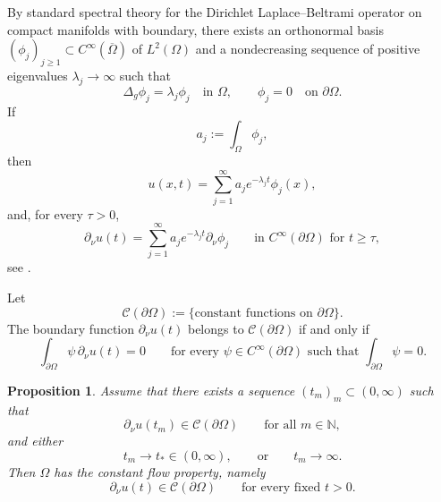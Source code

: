 \documentclass[a4paper,11pt]{article}
\newtheorem{proposition}[theorem]{Proposition}
\numberwithin{equation}{section}
\begin{document}
By standard spectral theory for the Dirichlet Laplace--Beltrami operator on
compact manifolds with boundary, there exists an orthonormal basis
$(\phi_j)_{j\geq 1}\subset C^\infty(\overline{\Omega})$ of $L^2(\Omega)$ and
a nondecreasing sequence of positive eigenvalues $\lambda_j\to\infty$ such
that
\[
\Delta_g\phi_j=\lambda_j\phi_j\quad\text{in }\Omega,\qquad \phi_j=0
\quad\text{on }\partial\Omega.
\]
If
\[
a_j:=\int_\Omega \phi_j,
\]
then
\begin{equation}\label{eq:spectral-u}
u(x,t)=\sum_{j=1}^\infty a_j e^{-\lambda_j t}\phi_j(x),
\end{equation}
and, for every $\tau>0$,
\begin{equation}\label{eq:spectral-du}
\partial_\nu u(t)=\sum_{j=1}^\infty a_j e^{-\lambda_j t}\partial_\nu\phi_j
\qquad\text{in }C^\infty(\partial\Omega)\text{ for }t\geq \tau,
\end{equation}
see \cite[Chapters VI--VII]{MR768584}.

Let
\[
\mathcal C(\partial\Omega):=\{ \text{constant functions on }\partial\Omega\}.
\]
The boundary function $\partial_\nu u(t)$ belongs to
$\mathcal C(\partial\Omega)$ if and only if
\[
\int_{\partial\Omega}\psi\,\partial_\nu u(t)=0
\qquad\text{for every }\psi\in C^\infty(\partial\Omega)
\text{ such that }\int_{\partial\Omega}\psi=0.
\]

\begin{proposition}\label{prop:riem-cfp}
Assume that there exists a sequence $(t_m)_m\subset (0,\infty)$ such that
\[
\partial_\nu u(t_m)\in \mathcal C(\partial\Omega)\qquad\text{for all }m\in\mathbb{N},
\]
and either
\[
t_m\to t_\ast\in (0,\infty),
\qquad\text{or}\qquad
t_m\to \infty.
\]
Then $\Omega$ has the \emph{constant flow property}, namely
\[
\partial_\nu u(t)\in \mathcal C(\partial\Omega)\qquad\text{for every fixed }t>0.
\]
\end{proposition}
\end{document}
